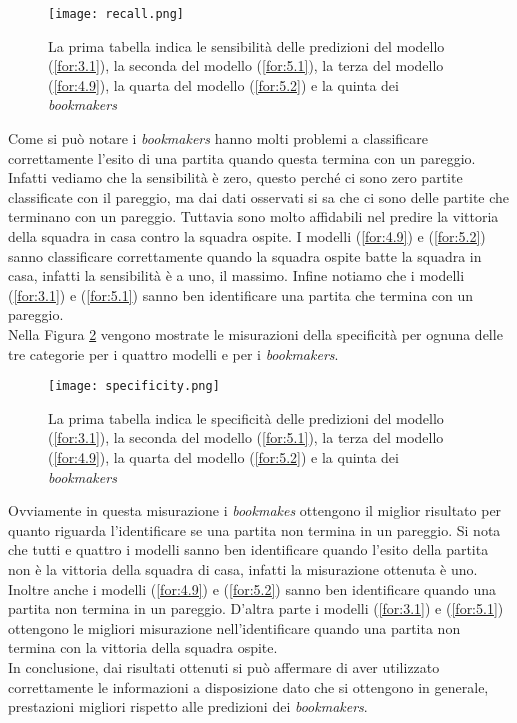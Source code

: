 \begin{figure}[htbp]
	\begin{center}
		\texttt{[image: recall.png]}
		\caption{La prima tabella indica le sensibilità delle predizioni del modello (\ref{for:3.1}), la seconda del modello (\ref{for:5.1}), la terza del modello (\ref{for:4.9}), la quarta del modello (\ref{for:5.2}) e la quinta dei \emph{bookmakers}
			\label{fig:recall}}
	\end{center}
\end{figure}
Come si può notare i \emph{bookmakers} hanno molti problemi a classificare correttamente l'esito di una partita quando questa termina con un pareggio. Infatti vediamo che la sensibilità è zero, questo perché ci sono zero partite classificate con il pareggio, ma dai dati osservati si sa che ci sono delle partite che terminano con un pareggio. Tuttavia sono molto affidabili nel predire la vittoria della squadra in casa contro la squadra ospite. I modelli (\ref{for:4.9}) e (\ref{for:5.2}) sanno classificare correttamente quando la squadra ospite batte la squadra in casa, infatti la sensibilità è a uno, il massimo. Infine notiamo che i modelli (\ref{for:3.1}) e (\ref{for:5.1}) sanno ben identificare una partita che termina con un pareggio.\\
Nella Figura \ref{fig:speci} vengono mostrate le misurazioni della specificità per ognuna delle tre categorie per i quattro modelli e per i \emph{bookmakers}. \\
\pagebreak
\begin{figure}[htbp]
	\begin{center}
		\texttt{[image: specificity.png]}
		\caption{La prima tabella indica le specificità delle predizioni del modello (\ref{for:3.1}), la seconda del modello (\ref{for:5.1}), la terza del modello (\ref{for:4.9}), la quarta del modello (\ref{for:5.2}) e la quinta dei \emph{bookmakers}
			\label{fig:speci}}
	\end{center}
\end{figure}

Ovviamente in questa misurazione i \emph{bookmakes} ottengono il miglior risultato per quanto riguarda l'identificare se una partita non termina in un pareggio. Si nota che tutti e quattro i modelli sanno ben identificare quando l'esito della partita non è la vittoria della squadra di casa, infatti la misurazione ottenuta è uno. Inoltre anche i modelli (\ref{for:4.9}) e (\ref{for:5.2}) sanno ben identificare quando una partita non termina in un pareggio. D'altra parte i modelli (\ref{for:3.1}) e (\ref{for:5.1}) ottengono le migliori misurazione nell'identificare quando una partita non termina con la vittoria della squadra ospite.\\

In conclusione, dai risultati ottenuti si può affermare di aver utilizzato correttamente le informazioni a disposizione dato che si ottengono in generale, prestazioni migliori rispetto alle predizioni dei \emph{bookmakers}.